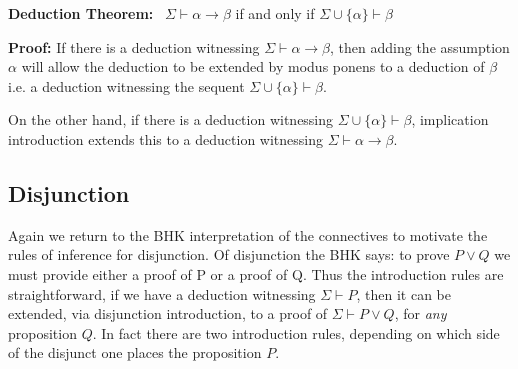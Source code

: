 \documentclass{book}
\begin{document}
    {\bf Deduction Theorem:} \ $\Sigma \vdash \alpha \rightarrow \beta$ if and only if $\Sigma \cup \{\alpha\} \vdash \beta$

	{\bf Proof:} If there is a deduction witnessing $\Sigma \vdash \alpha \rightarrow \beta$, then adding the assumption $\alpha$ will allow the deduction to be extended by modus ponens to a deduction of $\beta$ i.e. a deduction witnessing the sequent $\Sigma \cup \{\alpha\} \vdash \beta$. 

    On the other hand, if there is a deduction witnessing $\Sigma \cup \{\alpha\} \vdash \beta$, implication introduction extends this to a deduction witnessing $\Sigma \vdash \alpha \rightarrow \beta$.

    
    \newpage
    \subsection*{Disjunction}

    Again we return to the BHK interpretation of the connectives to motivate the rules of inference for disjunction. Of disjunction the BHK says: to prove $P \lor Q$  we must provide either a proof of P or a proof of Q. Thus the introduction rules are straightforward, if we have a deduction witnessing $\Sigma \vdash P$, then it can be extended, via disjunction introduction, to a proof of $\Sigma \vdash P \lor Q$, for \emph{any} proposition $Q$. In fact there are two introduction rules, depending on which side of the disjunct one places the proposition $P$. 

    \vspace{0.1cm}
\end{document}
